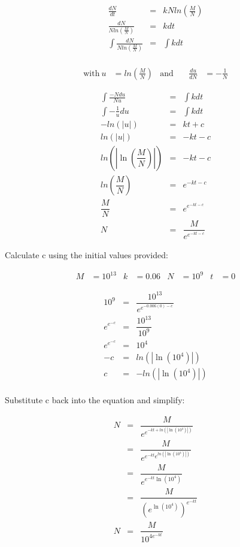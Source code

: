 \begin{eqnarray*}
\frac{dN}{dt}                                &=& kNln\left(\frac{M}{N} \right) \\
\frac{dN}{Nln\left(\frac{M}{N} \right)}      &=& kdt \\
\int \frac{dN}{Nln\left(\frac{M}{N} \right)} &=& \int kdt \\
\end{eqnarray*}

\begin{align*}
\text{with}\ u &= ln\left(\frac{M}{N} \right) & \text{and}\ && \frac{du}{dN} &= -\frac{1}{N}
\end{align*}

\begin{eqnarray*}
\int \frac{-Ndu}{Nu} &=& \int kdt \\
\int -\frac{1}{u}du &=& \int kdt \\
-ln\left(|{u}| \right) &=& kt + c \\
ln\left(|{u}| \right) &=& -kt - c \\
ln\left(\left|\ln\left(\dfrac{M}{N}\right)\right|\right) &=& -kt - c \\
ln\left(\dfrac{M}{N}\right) &=& e^{-kt - c} \\
\dfrac{M}{N}                &=& e^{e^{-kt - c}} \\
N                           &=& \dfrac{M}{e^{e^{-kt - c}}}
\end{eqnarray*}


\clearpage

Calculate c using the initial values provided:

\begin{align*}
    M &= 10^{13} & k &= 0.06 & N &= 10^9 & t &= 0
\end{align*}

\begin{eqnarray*}
10^9        &=& \dfrac{10^{13}}{e^{e^{-0.006(0) - c}}} \\
e^{e^{-c}}  &=& \dfrac{10^{13}}{10^9} \\
e^{e^{-c}}  &=& {10^4} \\
-c          &=& ln\left(\left|\ln\left({10^4}\right)\right|\right) \\
c           &=& -ln\left(\left|\ln\left({10^4}\right)\right|\right) \\
\end{eqnarray*}

Substitute c back into the equation and simplify:

\begin{eqnarray*}
N &=& \dfrac{M}{e^{e^{-kt + ln\left(\left|\ln\left({10^4}\right)\right|\right)}}} \\
  &=& \dfrac{M}{e^{e^{-kt} e^{ln\left(\left|\ln\left({10^4}\right)\right|\right)}}} \\
  &=& \dfrac{M}{e^{e^{-kt} \ln\left({10^4}\right)}} \\
  &=& \dfrac{M}{(e^{\ln\left({10^4}\right)})^{e^{-kt}}} \\
N  &=& \dfrac{M}{10^{4e^{-kt}}}
\end{eqnarray*}

\clearpage